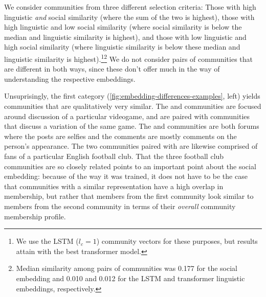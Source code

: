 \documentclass[11pt]{article}
\begin{document}
We consider communities from three different selection criteria: 
Those with high linguistic \emph{and} social similarity 
(where the sum of the two is highest),
those with high linguistic and low social similarity
(where social similarity is below the median and linguistic similarity is highest), and
those with low linguistic and high social similarity
(where linguistic similarity is below these median and linguistic similarity is highest).\footnote{We use the LSTM ($l_c=1$) community vectors for these purposes, 
  but results attain with the best transformer model.}\footnote{Median similarity
  among pairs of communities was \num{0.177} for the social embedding
  and \num{0.010} and \num{0.012} for the LSTM and transformer
  linguistic embeddings, respectively.}
We do not consider pairs of communities that are different in both ways,
since these don't offer much in the way of understanding the respective embeddings.

Unsuprisingly, the first category (\cref{fig:embedding-differences-examples}, left) yields communities that are qualitatively very similar. 
The  and  communities are focused
around discussion of a particular videogame, and are paired
with communities that discuss a variation of the same game.
The  and  communities are both 
forums where the posts are selfies and the comments are mostly 
comments on the person's appearance.
The two communities paired with  are 
likewise comprised of fans of a particular English football club.
That the three football club communities are so closely related points
to an important point about the social embedding: because of the way
it was trained, it does not have to be the case that communities with
a similar representation have a high overlap in membership,
but rather that members from the first community look similar
to members from the second community in terms of their \emph{overall}
community membership profile.
\end{document}
